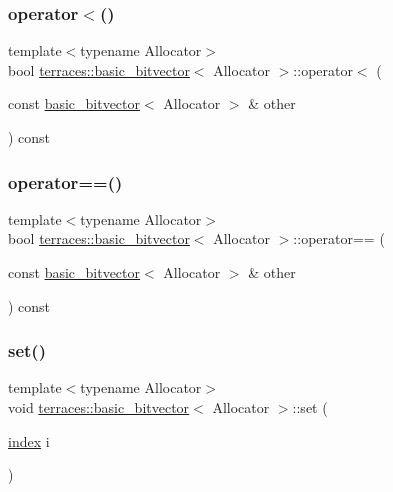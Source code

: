 \subsubsection{\texorpdfstring{operator$<$()}{operator<()}}
{\footnotesize\ttfamily template$<$typename Allocator$>$ \\
bool \hyperlink{classterraces_1_1basic__bitvector}{terraces\+::basic\+\_\+bitvector}$<$ Allocator $>$\+::operator$<$ (\begin{DoxyParamCaption}\item[{const \hyperlink{classterraces_1_1basic__bitvector}{basic\+\_\+bitvector}$<$ Allocator $>$ \&}]{other }\end{DoxyParamCaption}) const\hspace{0.3cm}{\ttfamily [inline]}}

\mbox{\label{classterraces_1_1basic__bitvector_ad4299081f5f8a3d3d16b662941801400}} 
\subsubsection{\texorpdfstring{operator==()}{operator==()}}
{\footnotesize\ttfamily template$<$typename Allocator$>$ \\
bool \hyperlink{classterraces_1_1basic__bitvector}{terraces\+::basic\+\_\+bitvector}$<$ Allocator $>$\+::operator== (\begin{DoxyParamCaption}\item[{const \hyperlink{classterraces_1_1basic__bitvector}{basic\+\_\+bitvector}$<$ Allocator $>$ \&}]{other }\end{DoxyParamCaption}) const\hspace{0.3cm}{\ttfamily [inline]}}

\mbox{\label{classterraces_1_1basic__bitvector_a08123518674191423e1f8872ef665650}} 
\subsubsection{\texorpdfstring{set()}{set()}}
{\footnotesize\ttfamily template$<$typename Allocator$>$ \\
void \hyperlink{classterraces_1_1basic__bitvector}{terraces\+::basic\+\_\+bitvector}$<$ Allocator $>$\+::set (\begin{DoxyParamCaption}\item[{\hyperlink{namespaceterraces_adbc33ccb543d1634e96d0eb02e472c77}{index}}]{i }\end{DoxyParamCaption})\hspace{0.3cm}{\ttfamily [inline]}}

